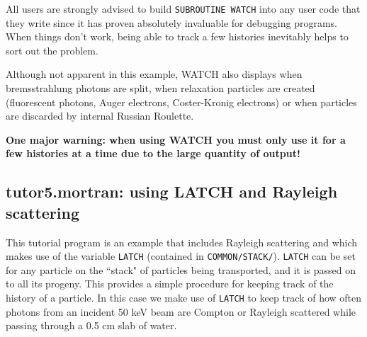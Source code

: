 All users are strongly advised to build {\tt SUBROUTINE WATCH} into any
user code that they write since it has proven absolutely invaluable for
debugging programs.  When things don't work, being able to track a few
histories inevitably helps to sort out the problem.

Although not apparent in this example, WATCH also displays when
bremsstrahlung photons are split, when relaxation particles are created
(fluorescent photons, Auger electrons, Coster-Kronig electrons) or when
particles are discarded by internal Russian Roulette.

{\bfseries One major warning: when using WATCH you must only use it for a
few histories at a time due to the large quantity of output!}



\begin{latexonly}




\clearpage
\end{latexonly}

\begin{htmlonly}
\clearpage

\clearpage

\clearpage

\clearpage

\clearpage
\end{htmlonly}




\subsection{tutor5.mortran: using LATCH and Rayleigh scattering}
%
This tutorial program is an example that includes Rayleigh scattering
and which makes use of the variable {\tt LATCH} (contained in
{\tt COMMON/STACK/}).
{\tt LATCH} can be set for any particle on the ``stack" of particles being
transported, and it is passed on to all its progeny.  This provides a
simple procedure for keeping track of the history of a particle.  In
this case we make use of {\tt LATCH} to keep track of how often photons
from an incident 50 keV beam are Compton or Rayleigh scattered while
passing through a 0.5 cm slab of water.
 
